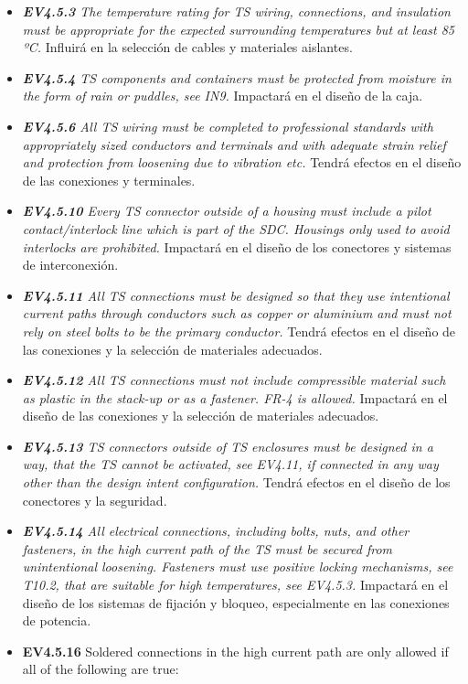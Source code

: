 \begin{itemize}
    \item \textit{\textbf{EV4.5.3} The temperature rating for TS wiring, connections, and insulation must be appropriate for the expected surrounding temperatures but at least 85 ºC.} Influirá en la selección de cables y materiales aislantes.
    \item \textit{\textbf{EV4.5.4} TS components and containers must be protected from moisture in the form of rain or puddles, see IN9.} Impactará en el diseño de la caja.
    \item \textit{\textbf{EV4.5.6} All TS wiring must be completed to professional standards with appropriately sized conductors and terminals and with adequate strain relief and protection from loosening due to vibration etc.} Tendrá efectos en el diseño de las conexiones y terminales.
    \item \textit{\textbf{EV4.5.10} Every TS connector outside of a housing must include a pilot contact/interlock line which is part of the SDC. Housings only used to avoid interlocks are prohibited.} Impactará en el diseño de los conectores y sistemas de interconexión.
    \item \textit{\textbf{EV4.5.11} All TS connections must be designed so that they use intentional current paths through conductors such as copper or aluminium and must not rely on steel bolts to be the primary conductor.} Tendrá efectos en el diseño de las conexiones y la selección de materiales adecuados.
    \item \textit{\textbf{EV4.5.12} All TS connections must not include compressible material such as plastic in the stack-up or as a fastener. FR-4 is allowed.} Impactará en el diseño de las conexiones y la selección de materiales adecuados.
    \item \textit{\textbf{EV4.5.13} TS connectors outside of TS enclosures must be designed in a way, that the TS cannot be activated, see EV4.11, if connected in any way other than the design intent configuration.} Tendrá efectos en el diseño de los conectores y la seguridad.
    \item \textit{\textbf{EV4.5.14} All electrical connections, including bolts, nuts, and other fasteners, in the high current path of the TS must be secured from unintentional loosening. Fasteners must use positive locking mechanisms, see T10.2, that are suitable  for high temperatures, see EV4.5.3.} Impactará en el diseño de los sistemas de fijación y bloqueo, especialmente en las conexiones de potencia.
    \item \begin{itquote} \textbf{EV4.5.16} Soldered connections in the high current path are only allowed if all of the following are true: 

\end{itquote}
\end{itemize}
